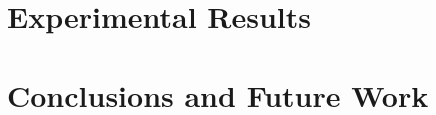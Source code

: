 \section{Experimental Results}
\label{sec:results}


%
%
%
%

\section{Conclusions and Future Work}
\label{sec:conclusions}

%
%
